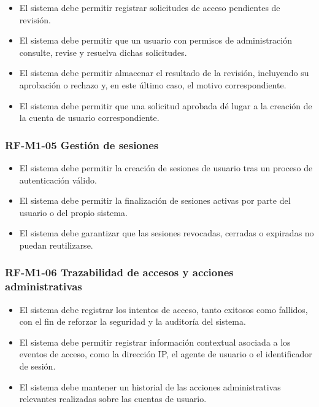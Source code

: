 \begin{itemize}
    \item El sistema debe permitir registrar solicitudes de acceso pendientes de revisión.
    \item El sistema debe permitir que un usuario con permisos de administración consulte, revise y resuelva dichas solicitudes.
    \item El sistema debe permitir almacenar el resultado de la revisión, incluyendo su aprobación o rechazo y, en este último caso, el motivo correspondiente.
    \item El sistema debe permitir que una solicitud aprobada dé lugar a la creación de la cuenta de usuario correspondiente.
\end{itemize}

\vspace{-0.75em}
\subsubsection{RF-M1-05 Gestión de sesiones}
\vspace{-1em}

\begin{itemize}
    \item El sistema debe permitir la creación de sesiones de usuario tras un proceso de autenticación válido.
    \item El sistema debe permitir la finalización de sesiones activas por parte del usuario o del propio sistema.
    \item El sistema debe garantizar que las sesiones revocadas, cerradas o expiradas no puedan reutilizarse.
\end{itemize}

\vspace{-0.75em}
\subsubsection{RF-M1-06 Trazabilidad de accesos y acciones administrativas}
\vspace{-1em}

\begin{itemize}
    \item El sistema debe registrar los intentos de acceso, tanto exitosos como fallidos, con el fin de reforzar la seguridad y la auditoría del sistema.
    \item El sistema debe permitir registrar información contextual asociada a los eventos de acceso, como la dirección IP, el agente de usuario o el identificador de sesión.
    \item El sistema debe mantener un historial de las acciones administrativas relevantes realizadas sobre las cuentas de usuario.
\end{itemize}


